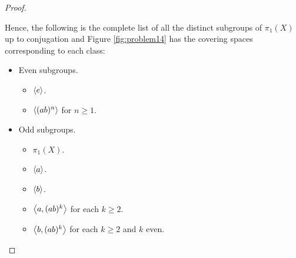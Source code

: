\documentclass[12pt, psamsfonts]{amsart}
\theoremstyle{definition}
\theoremstyle{remark}
\numberwithin{equation}{section}
\begin{document}
\begin{proof}
\begin{itemize}
    \end{itemize}
  Hence, the following is the complete list of all the distinct subgroups of $\pi_1(X)$ up to conjugation and Figure \ref{fig:problem14} has the covering spaces corresponding to each class:
  \begin{itemize}
    \item
      Even subgroups.
      \begin{itemize}
        \item
          $\ev{e}$.
        \item
          $\ev{(ab)^n}$ for $n \geq 1$.
      \end{itemize}
    \item
      Odd subgroups.
      \begin{itemize}
        \item
          $\pi_1(X)$.
        \item
          $\ev{a}$.
        \item
          $\ev{b}$.
        \item
          $\ev{a, (ab)^k}$ for each $k \geq 2$.
        \item
          $\ev{b, (ab)^k}$ for each $k \geq 2$ and $k$ even.
      \end{itemize}
  \end{itemize}
\end{proof}
\end{document}
